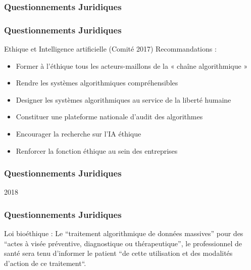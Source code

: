 \begin{frame}
  \frametitle{Questionnements Juridiques}
\end{frame}

\begin{frame}
  \frametitle{Questionnements Juridiques}
  Ethique et Intelligence artificielle (Comité 2017)
  Recommandations :
  \begin{itemize}
  \item Former à l’éthique tous les acteurs-maillons de la « chaîne algorithmique » 
  \item Rendre les systèmes algorithmiques compréhensibles
  \item Designer les systèmes algorithmiques au service de la liberté humaine
  \item Constituer une plateforme nationale d’audit des algorithmes
  \item Encourager la recherche sur l’IA éthique
  \item Renforcer la fonction éthique au sein des entreprises
  \end{itemize}
\end{frame}

\begin{frame}
  \frametitle{Questionnements Juridiques}
  2018
\end{frame}

\begin{frame}
  \frametitle{Questionnements Juridiques}
  Loi bioéthique :
  Le ``traitement algorithmique de données massives'' pour des ``actes à visée préventive, diagnostique ou thérapeutique'', le professionnel de santé sera tenu d'informer le patient ``de cette utilisation et des modalités d’action de ce traitement``.
\end{frame}
